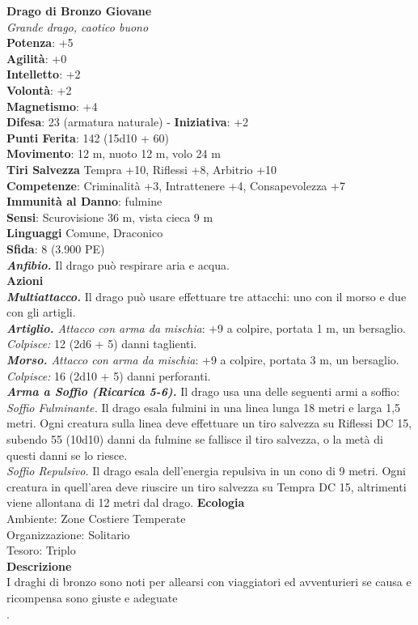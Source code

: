 \begin{multicols}{2}
\medskip\textbf{Drago di Bronzo Giovane}\\
\emph{Grande drago, caotico buono}\\
\textbf{Potenza}: +5\\
\textbf{Agilità}: +0\\
\textbf{Intelletto}: +2\\
\textbf{Volontà}: +2\\
\textbf{Magnetismo}: +4\\
\textbf{Difesa}: 23 (armatura naturale) - \textbf{Iniziativa}: +2\\
\textbf{Punti Ferita}: 142 (15d10 + 60)\\
\textbf{Movimento}: 12 m, nuoto 12 m, volo 24 m\\
\textbf{Tiri Salvezza} Tempra +10, Riflessi +8, Arbitrio +10\\
\textbf{Competenze}: Criminalità +3, Intrattenere +4, Consapevolezza +7\\
\textbf{Immunità al Danno}: fulmine\\
\textbf{Sensi}: Scurovisione 36 m, vista cieca 9 m\\
\textbf{Linguaggi} Comune, Draconico\\
\textbf{Sfida}: 8 (3.900 PE)\smallskip\\
\emph{\textbf{Anfibio.}} Il drago può respirare aria e acqua.\\
\smallskip\textbf{Azioni}\\
\emph{\textbf{Multiattacco.}} Il drago può usare effettuare tre attacchi: uno con il morso e due con gli artigli.\\
\emph{\textbf{Artiglio.} Attacco con arma da mischia}: +9 a colpire, portata 1 m, un bersaglio.\\
\emph{Colpisce:} 12 (2d6 + 5) danni taglienti.\\
\emph{\textbf{Morso.} Attacco con arma da mischia}: +9 a colpire, portata 3 m, un bersaglio.\\
\emph{Colpisce:} 16 (2d10 + 5) danni perforanti.\\
\emph{\textbf{Arma a Soffio (Ricarica 5-6).}} Il drago usa una delle seguenti armi a soffio:\\
\emph{Soffio Fulminante.} Il drago esala fulmini in una linea lunga 18 metri e larga 1,5 metri. Ogni creatura sulla linea deve effettuare un tiro salvezza su Riflessi DC 15, subendo 55 (10d10) danni da fulmine se fallisce il tiro salvezza, o la metà di questi danni se lo riesce.\\
\emph{Soffio Repulsivo.} Il drago esala dell'energia repulsiva in un cono di 9 metri. Ogni creatura in quell'area deve riuscire un tiro salvezza su Tempra DC 15, altrimenti viene allontana di 12 metri dal drago.
\textbf{Ecologia}\\
Ambiente: Zone Costiere Temperate\\
Organizzazione: Solitario\\
Tesoro: Triplo\\
\textbf{Descrizione}\\
I draghi di bronzo sono noti per allearsi con viaggiatori ed avventurieri se causa e ricompensa sono giuste e adeguate\\
.


\end{multicols}
